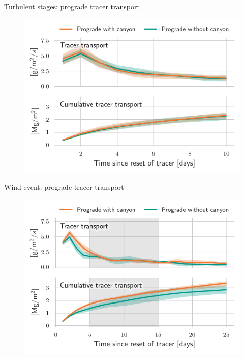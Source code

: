 \documentclass{beamer}
\begin{document}
\begin{frame}{Turbulent stages: prograde tracer transport}
\begin{figure}
\centering
\includegraphics{figures/exchange_Prograde_composite_Stratified.pdf}
\end{figure}
\end{frame}

\begin{frame}{Wind event: prograde tracer transport}
\begin{figure}
\centering
\includegraphics{figures/exchange_Prograde_composite_Event.pdf}
\end{figure}
\end{frame}
\end{document}
